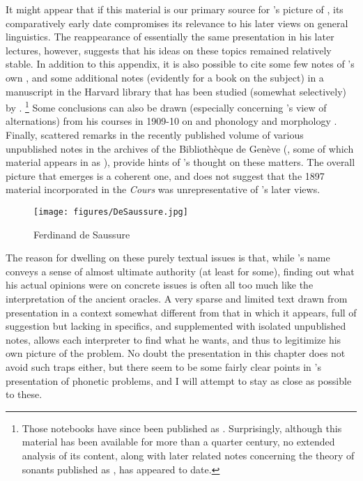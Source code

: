 It might appear that if this material is our primary source for
{\Saussure}'s picture of , its comparatively early date
compromises its relevance to his later views on general
linguistics. The reappearance of essentially the same presentation in
his later lectures, however, suggests that his ideas on these topics
remained relatively stable. In addition to this appendix, it is also
possible to cite some few notes of {\Saussure}'s own
\citet{godel54:notes}, and some additional notes (evidently for a book
on the subject) in a manuscript in the Harvard library that has been
studied (somewhat selectively) by \citet{jakobson70:saussure}.
\footnote{Those notebooks have since been published as
  \citealt{saussure83:notebooks}. Surprisingly, although this material
  has been available for more than a quarter century, no extended
  analysis of its content, along with later related notes concerning
  the theory of sonants published as \citealt{saussure97:sonants-notes},
  has appeared to date.}  Some conclusions can also be drawn
(especially concerning {\Saussure}'s view of alternations) from his
courses in 1909-10 on  and  phonology
\citet{reichler-beguelin80:saussure-grec-et-latin} and morphology
\citet{godel57:sources}. Finally, scattered remarks in the recently
published volume of various unpublished notes in the archives of the
Bibliothèque de Genève (\citealt{saussure11:ecrits}, some of which
material appears in  as \citealt{saussure06:writings}), provide
hints of {\Saussure}'s thought on these matters. The overall picture that
emerges is a coherent one, and does not suggest that the 1897 material
incorporated in the \textsl{Cours} was unrepresentative of {\Saussure}'s
later views.

\begin{wrapfigure}{l}{.4\textwidth}
  \texttt{[image: figures/DeSaussure.jpg]}
  \caption{Ferdinand de Saussure}
  \label{fig:ch.saussure_sound.saussure}
\end{wrapfigure}
The reason for dwelling on these purely textual issues is that, while
{\Saussure}'s name conveys a sense of almost ultimate authority (at least
for some), finding out what his actual opinions were on concrete
issues is often all too much like the interpretation of the ancient
oracles. A very sparse and limited text drawn from presentation in a
context somewhat different from that in which it appears, full of
suggestion but lacking in specifics, and supplemented with isolated
unpublished notes, allows each interpreter to find what he wants, and
thus to legitimize his own picture of the problem. No doubt the
presentation in this chapter does not avoid such traps either, but
there seem to be some fairly clear points in {\Saussure}'s presentation
of phonetic problems, and I will attempt to stay as close as possible
to these.

